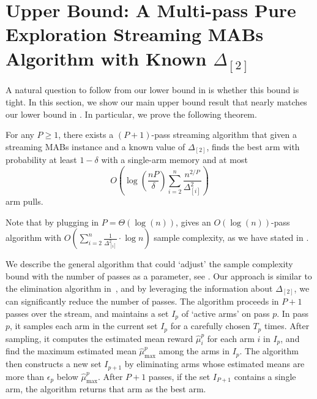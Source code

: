 
\section{Upper Bound: A Multi-pass Pure Exploration Streaming MABs Algorithm with Known $\Delta_{[2]}$}\label{sec:basic}
A natural question to follow from our lower bound in  is whether this bound is tight.
In this section, we show our main upper bound result that nearly matches our lower bound in . In particular, we prove the following theorem.
\begin{theorem}
	\label{thm:basic}
	For any $P\geq 1$, there exists a $(P + 1)$-pass streaming algorithm that given a streaming MABs instance and a known value of $\Delta_{[2]}$, finds the best arm with probability at least $1-\delta$ with a single-arm memory and at most \[O\left(\log \left(\frac{n P}{\delta}\right) \sum_{i = 2}^n \frac{n^{2/P}}{\Delta^2_{[i]}}\right)\]
	arm pulls. 
\end{theorem}

Note that by plugging in $P=\Theta(\log(n))$,  gives an $O(\log(n))$-pass algorithm with $O(\sum_{i = 2}^n \frac{1}{\Delta^2_{[i]}}\cdot \log{n})$ sample complexity, as we have stated in .

We describe the general algorithm that could `adjust' the sample complexity bound with the number of passes as a parameter, see . 
Our approach is similar to the elimination algorithm in~\cite{KarninKS13}, and by leveraging the information about \(\Delta_{[2]}\), we can significantly reduce the number of passes. 
The algorithm proceeds in \(P  +1\) passes over the stream, and maintains a set $I_p$ of `active arms' on pass $p$. In pass \(p\), it samples each arm in the current set \(I_p\) for a carefully chosen \(T_p\) times. After sampling, it computes the estimated mean reward \(\hat{\mu}^{p}_i\) for each arm \(i\) in \(I_p\), and find the maximum estimated mean \(\hat{\mu}^{p}_{\max}\) among the arms in $I_p$. The algorithm then constructs a new set \(I_{p + 1}\) by eliminating arms whose estimated means are more than \(\epsilon_p\) below \(\hat{\mu}^{p}_{\max}\). After \(P + 1\) passes, if the set \(I_{P + 1}\) contains a single arm, the algorithm returns that arm as the best arm. 

